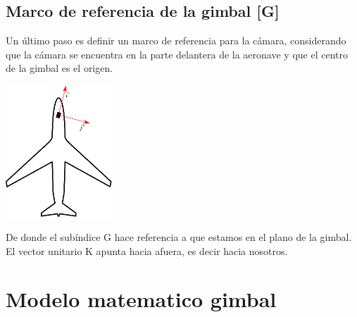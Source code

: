 \subsection{Marco de referencia de la gimbal [G]}
Un último paso es definir un marco de referencia para la cámara, considerando que la cámara se encuentra en la parte delantera de
la aeronave y que el centro de la gimbal es el origen.
\begin{center}
	\includegraphics[width=0.3\textwidth]{Contenido/Cuerpo/Capitulo3/Fig7.eps}
	\label{fig:ModeloMat:Fig1}
\end{center}
De donde el subíndice G hace referencia a que estamos en el plano de la gimbal. El vector unitario K apunta hacia afuera,
es decir hacia nosotros.


\section{Modelo matematico gimbal}